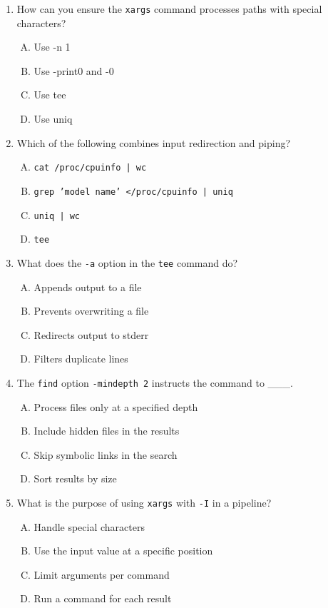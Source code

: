\documentclass[a4paper]{report}
\begin{document}
\begin{enumerate}[1.]
    \item How can you ensure the \texttt{xargs} command processes paths with special characters?  
    \begin{enumerate}[A)]
        \item Use -n 1  
        \item Use -print0 and -0  
        \item Use tee  
        \item Use uniq  
    \end{enumerate}

    \item Which of the following combines input redirection and piping?  
    \begin{enumerate}[A)]
        \item \texttt{cat /proc/cpuinfo | wc}  
        \item \texttt{grep 'model name' </proc/cpuinfo | uniq}  
        \item \texttt{uniq | wc}  
        \item \texttt{tee}  
    \end{enumerate}

    \item What does the \texttt{-a} option in the \texttt{tee} command do?  
    \begin{enumerate}[A)]
        \item Appends output to a file  
        \item Prevents overwriting a file  
        \item Redirects output to stderr  
        \item Filters duplicate lines  
    \end{enumerate}

    \item The \texttt{find} option \texttt{-mindepth 2} instructs the command to \_\_\_.  
    \begin{enumerate}[A)]
        \item Process files only at a specified depth  
        \item Include hidden files in the results  
        \item Skip symbolic links in the search  
        \item Sort results by size  
    \end{enumerate}

    \item What is the purpose of using \texttt{xargs} with \texttt{-I} in a pipeline?  
    \begin{enumerate}[A)]
        \item Handle special characters  
        \item Use the input value at a specific position  
        \item Limit arguments per command  
        \item Run a command for each result  
    \end{enumerate}

\end{enumerate}
\end{document}
